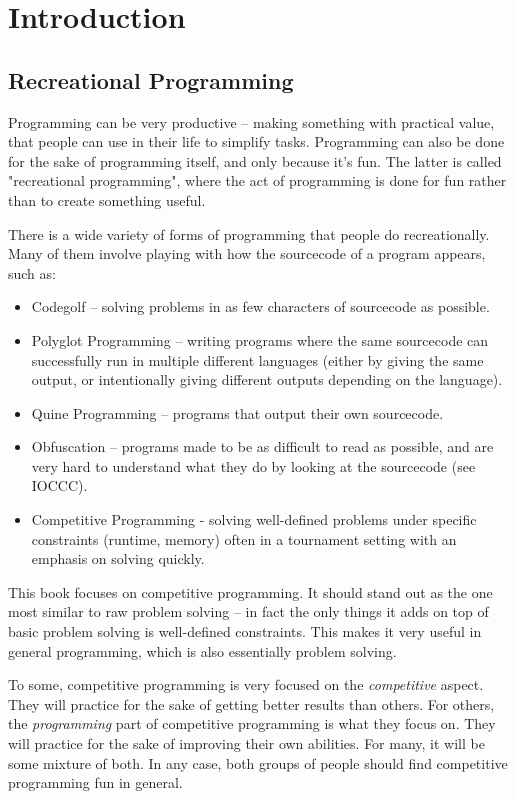 \section{Introduction}

\subsection{Recreational Programming}

Programming can be very productive -- making something with practical value, that people can use in their life to simplify tasks. Programming can also be done for the sake of programming itself, and only because it's fun. The latter is called "recreational programming", where the act of programming is done for fun rather than to create something useful.

There is a wide variety of forms of programming that people do recreationally. Many of them involve playing with how the sourcecode of a program appears, such as:
\begin{itemize}
\item Codegolf -- solving problems in as few characters of sourcecode as possible.
\item Polyglot Programming -- writing programs where the same sourcecode can successfully run in multiple different languages (either by giving the same output, or intentionally giving different outputs depending on the language).
\item Quine Programming -- programs that output their own sourcecode.
\item Obfuscation -- programs made to be as difficult to read as possible, and are very hard to understand what they do by looking at the sourcecode (see IOCCC).
\item Competitive Programming - solving well-defined problems under specific constraints (runtime, memory) often in a tournament setting with an emphasis on solving quickly.
\end{itemize}

This book focuses on competitive programming. It should stand out as the one most similar to raw problem solving -- in fact the only things it adds on top of basic problem solving is well-defined constraints. This makes it very useful in general programming, which is also essentially problem solving.

To some, competitive programming is very focused on the \textit{competitive} aspect. They will practice for the sake of getting better results than others. For others, the \textit{programming} part of competitive programming is what they focus on. They will practice for the sake of improving their own abilities. For many, it will be some mixture of both. In any case, both groups of people should find competitive programming fun in general.

